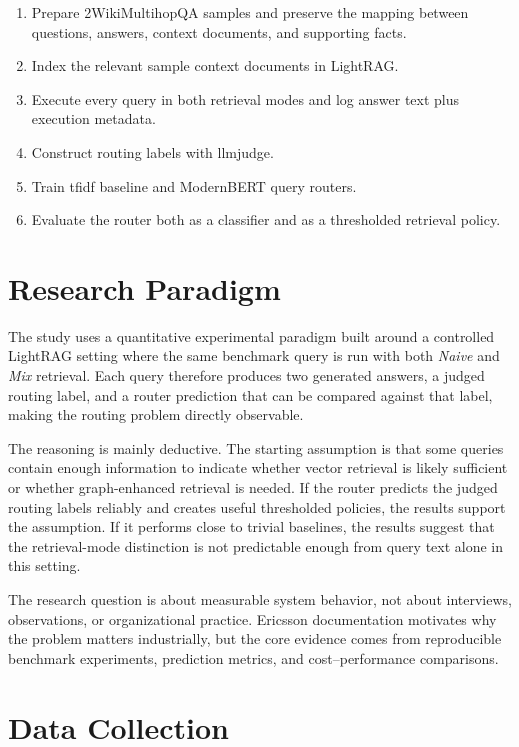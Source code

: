 \documentclass[english, bibtex]{kththesis}               %
\numberwithin{listing}{chapter}
\begin{document}
\begin{enumerate}[leftmargin=*, label=\textbf{Step \arabic*}]
    \item Prepare 2WikiMultihopQA samples and preserve the mapping between questions, answers, context documents, and supporting facts.
    \item Index the relevant sample context documents in LightRAG.
    \item Execute every query in both retrieval modes and log answer text plus execution metadata.
    \item Construct routing labels with \gls{llmjudge}.
    \item Train \gls{tfidf} baseline and ModernBERT query routers.
    \item Evaluate the router both as a classifier and as a thresholded retrieval policy.
\end{enumerate}

\section{Research Paradigm}
\label{sec:researchParadigm}

The study uses a quantitative experimental paradigm built around a controlled LightRAG setting where the same benchmark query is run with both \emph{Naive} and \emph{Mix} retrieval. Each query therefore produces two generated answers, a judged routing label, and a router prediction that can be compared against that label, making the routing problem directly observable.

The reasoning is mainly deductive. The starting assumption is that some queries contain enough information to indicate whether vector retrieval is likely sufficient or whether graph-enhanced retrieval is needed. If the router predicts the judged routing labels reliably and creates useful thresholded policies, the results support the assumption. If it performs close to trivial baselines, the results suggest that the retrieval-mode distinction is not predictable enough from query text alone in this setting.

The research question is about measurable system behavior, not about interviews, observations, or organizational practice. Ericsson documentation motivates why the problem matters industrially, but the core evidence comes from reproducible benchmark experiments, prediction metrics, and cost--performance comparisons.

\section{Data Collection}
\label{sec:dataCollection}
\end{document}
